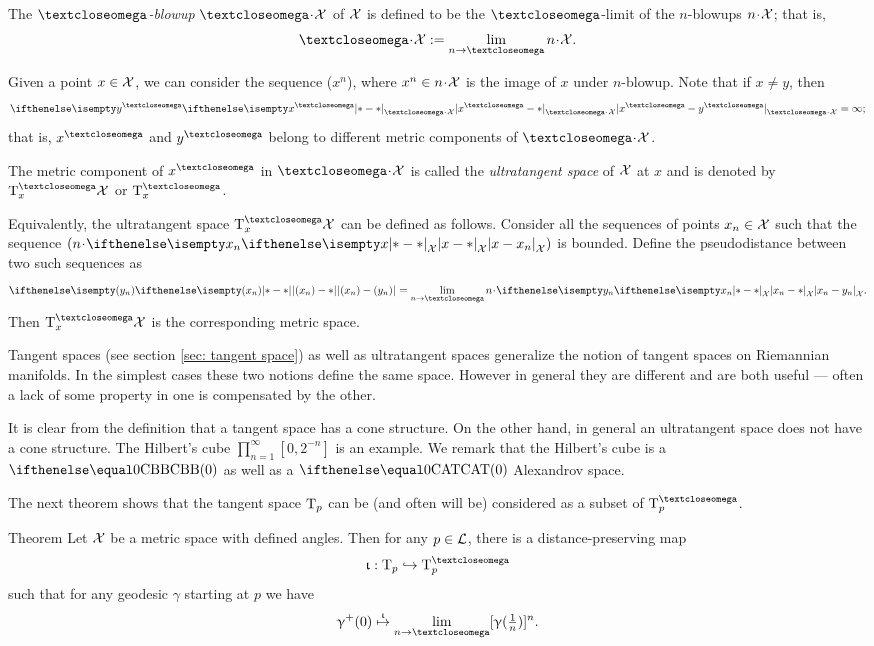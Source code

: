 The \emph{$\o$-blowup} $\o\cdot\spc{X}$ of $\mathcal{X}$ is defined to be the $\o$-limit
of the $n$-blowups $n\cdot\spc{X}$; that is,
\[\o\cdot\spc{X}
\df
\lim_{n\to\o} n\cdot\spc{X}.\]

Given a point $x\in \spc{X}$, we can consider the sequence ($x^n$), where $x^n\in n\cdot\spc{X}$ is the image of $x$ under $n$-blowup.
Note that if $x\ne y$, then 
\[\dist{x^\o}{y^\o}{\o\cdot\spc{X}}=\infty;\]
that is, 
$x^\o$ and $y^\o$ 
belong to different metric components of $\o\cdot\spc{X}$.

The metric component of $x^\o$ in $\o\cdot\spc{X}$ is called the \emph{ultratangent space} of $\mathcal{X}$ at $x$ and  is denoted by $\T^\o_x\spc{X}$ or $\T^\o_x$.

Equivalently, the ultratangent space $\T^\o_x\spc{X}$ can be defined as follows.
Consider all the sequences of points $x_n\in \spc{X}$ such that the sequence 
 $(n\cdot\dist{x}{x_n}{\spc{X}})$ is bounded.
Define the pseudodistance between two such sequences as 
\[\dist{(x_n)}{(y_n)}{}
=
\lim_{n\to\o}n\cdot\dist{x_n}{y_n}{\spc{X}}.\]
Then $\T^\o_x\spc{X}$ is the corresponding metric space.

Tangent spaces (see section \ref{sec: tangent space})  as well as ultratangent spaces 
generalize the notion of tangent spaces on Riemannian manifolds.
In  the simplest cases these two notions define the same space.
However in general they are different and are both useful ---
often a lack of some property in one is compensated by the other.%

It is clear from the definition that a tangent space has a cone structure.
On the other hand, in general an ultratangent space does not have a cone structure. The Hilbert's cube $\prod_{n=1}^\infty[0,2^{-n}]$ is an example. We remark that the Hilbert's cube  is a $\Alex{0}$ as well as  a $\CAT{0}$ Alexandrov space.

The next theorem shows that the tangent space $\text{\rm T}_p$ can be (and often will be) considered as a subset of  $\T^\o_p$.

\begin{thm}{Theorem}\label{thm:tangent-ultratangent}
\label{thm:T-in-T^w} 
Let $\mathcal{X}$ be a metric space with defined angles.
Then for any $p\in \spc{L}$, there is a distance-preserving map 
\[\iota:\T_p\hookrightarrow \T^\o_p\] 
such that for any geodesic $\gamma$ starting at $p$
we have 
\[\gamma^+(0)\stackrel{\iota}{\mapsto} \lim_{n\to\o}[\gamma(\tfrac1n)]^n.\]

\end{thm}

